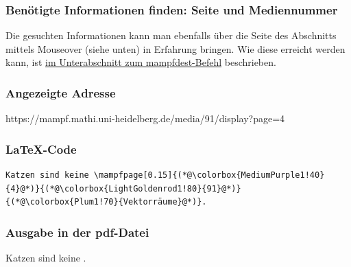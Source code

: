 \documentclass[parskip=off,index=totocnumbered]{scrartcl}
\begin{document}
\subsubsection*{Benötigte Informationen finden: Seite und Mediennummer}
Die gesuchten Informationen kann man ebenfalls über die Seite des Abschnitts mittels Mouseover (siehe unten) in Erfahrung bringen. Wie diese erreicht werden kann, ist \hyperref[subsubsec:infos]{im Unterabschnitt zum mampfdest-Befehl} beschrieben.
\vspace{0.4cm}  

\noindent \begin{minipage}{\textwidth}
\end{minipage}
\vspace{0.1cm}

\subsubsection*{Angezeigte Adresse}
https://mampf.mathi.uni-heidelberg.de/media/\colorbox{LightGoldenrod1!80}{91}/display?page=\colorbox{MediumPurple1!40}{4}

\subsubsection*{\LaTeX-Code}
\vspace{-0.2cm}
   \begin{lstlisting}   
Katzen sind keine \mampfpage[0.15]{(*@\colorbox{MediumPurple1!40}{4}@*)}{(*@\colorbox{LightGoldenrod1!80}{91}@*)}{(*@\colorbox{Plum1!70}{Vektorräume}@*)}. 
   \end{lstlisting}
\vspace{0.2cm}

\subsubsection*{Ausgabe in der pdf-Datei}
Katzen sind keine . 
\vspace{0.4cm}
  
\end{document}
